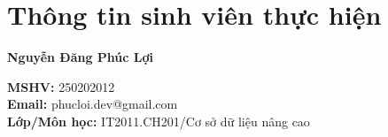 \chapter*{Thông tin sinh viên thực hiện}

\vspace{1cm}

\noindent
\begin{minipage}[t]{0.3\textwidth}
    \vspace{0pt}
    \centering
\end{minipage}
\hfill
\begin{minipage}[t]{0.65\textwidth}
    \vspace{0pt}
    \textbf{\Large Nguyễn Đăng Phúc Lợi}
    
    \vspace{0.3cm}
    
    \textbf{MSHV:} 250202012 \\
    \textbf{Email:} phucloi.dev@gmail.com \\
    \textbf{Lớp/Môn học:} IT2011.CH201/Cơ sở dữ liệu nâng cao
    
\end{minipage}%

\vspace{2cm}
